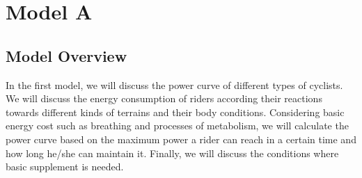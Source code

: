 \documentclass[14pt]{article}
\theoremstyle{definition}
\theoremstyle{remark}
\numberwithin{equation}{section}
\begin{document}
	\section{Model A}
	\subsection{Model Overview}
	In the first model, we will discuss the power curve of different types of cyclists. We will discuss the energy consumption of riders according their reactions towards different kinds of terrains and their body conditions. Considering basic energy cost such as breathing and processes of metabolism, we will calculate the power curve based on the maximum power a rider can reach in a certain time and how long he/she can maintain it. Finally, we will discuss the conditions where basic supplement is needed.
\end{document}
